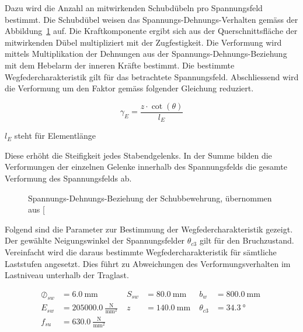 \documentclass[
  11pt,
  letterpaper,
]{scrreprt}
\begin{document}
Dazu wird die Anzahl an mitwirkenden Schubdübeln pro Spannungsfeld
bestimmt. Die Schubdübel weisen das Spannungs-Dehnungs-Verhalten gemäss
der Abbildung~\ref{fig-sigma-eps-a3v2} auf. Die Kraftkomponente ergibt
sich aus der Querschnittsfläche der mitwirkenden Dübel multipliziert mit
der Zugfestigkeit. Die Verformung wird mittels Multiplikation der
Dehnungen aus der Spannungs-Dehnungs-Beziehung mit dem Hebelarm der
inneren Kräfte bestimmt. Die bestimmte Wegfedercharakteristik gilt für
das betrachtete Spannungsfeld. Abschliessend wird die Verformung um den
Faktor gemäss folgender Gleichung reduziert.

\[
\gamma_{E} = \frac{z \cdot \cot(\theta)}{l_{E}}
\]

\(l_{E}\) steht für Elementlänge

Diese erhöht die Steifigkeit jedes Stabendgelenks. In der Summe bilden
die Verformungen der einzelnen Gelenke innerhalb des Spannungsfelds die
gesamte Verformung des Spannungsfelds ab.

\begin{figure}[H]


\caption{\label{fig-sigma-eps-a3v2}Spannungs-Dehnungs-Beziehung der
Schubbewehrung, übernommen aus
{[}\citeproc{ref-gitz_ansatze_2024}{1}{]}}

\end{figure}%

Folgend sind die Parameter zur Bestimmung der Wegfedercharakteristik
gezeigt. Der gewählte Neigungswinkel der Spannungsfelder \(\theta_{c3}\)
gilt für den Bruchzustand. Vereinfacht wird die daraus bestimmte
Wegfedercharakteristik für sämtliche Laststufen angesetzt. Dies führt zu
Abweichungen des Verformungsverhalten im Lastniveau unterhalb der
Traglast.

$$
\begin{aligned}
\oslash_{sw} &= 6.0\ \mathrm{mm} \; 
 &S_{sw} &= 80.0\ \mathrm{mm} \; 
 &b_{w} &= 800.0\ \mathrm{mm} \; 
\\[11pt]
 E_{sw} &= 205000.0\ \frac{\mathrm{N}}{\mathrm{mm}^{2}} \; 
 &z &= 140.0\ \mathrm{mm} \; 
 &\theta_{c3} &= 34.3\ \mathrm{°} \; 
\\[11pt]
 f_{su} &= 630.0\ \frac{\mathrm{N}}{\mathrm{mm}^{2}} \;
\end{aligned}
$$
\end{document}

